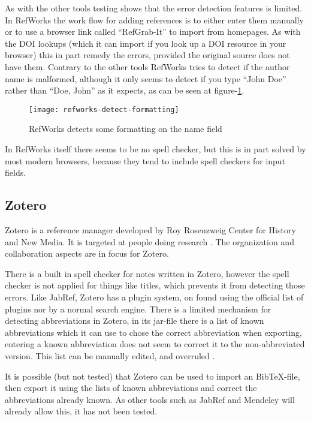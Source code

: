 As with the other tools testing shows that the error detection
features is limited.  In RefWorks the work flow for adding references
is to either enter them manually or to use a browser link called
``RefGrab-It'' to import from homepages.  As with the DOI lookups
(which it can import if you look up a DOI resource in your browser)
this in part remedy the errors, provided the original source does not
have them.  Contrary to the other tools RefWorks tries to detect if
the author name is malformed, although it only seems to detect if you
type ``John Doe'' rather than ``Doe, John'' as it expects, as can be
seen at figure-\ref{fig:refworks-detect-formatting}.

\begin{figure}[h]
    \centering
    \texttt{[image: refworks-detect-formatting]}
    \caption{RefWorks detects some formatting on the name field}
    \label{fig:refworks-detect-formatting}
\end{figure}

In RefWorks itself there seems to be no spell checker, but this is in
part solved by most modern browsers, because they tend to include
spell checkers for input fields.

\subsection{Zotero}
Zotero is a reference manager developed by Roy Rosenzweig Center for
History and New Media.  It is targeted at people doing research
.  The organization and collaboration
aspects are in focus for Zotero\cite{zotero_features}.

There is a built in spell checker for notes written in Zotero, however
the spell checker is not applied for things like titles, which
prevents it from detecting those errors.  Like JabRef, Zotero has a
plugin system, on found using the official list of plugins
\cite{zotero_plugins} nor by a normal search engine. There is a
limited mechanism for detecting abbreviations in Zotero, in its
jar-file there is a list of known abbreviations which it can use to
chose the correct abbreviation when exporting, entering a known
abbreviation does not seem to correct it to the non-abbreviated
version.  This list can be manually edited, and overruled
\cite{zotero_abbreviations}.

It is possible (but not tested) that Zotero can be used to import an
Bib{\TeX}-file, then export it using the lists of known abbreviations
and correct the abbreviations already known.  As other tools such as
JabRef and Mendeley will already allow this, it has not been tested.

